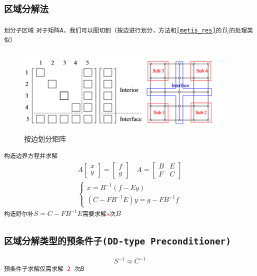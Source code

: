\documentclass[11pt, a4paper]{article}
\theoremstyle{plain}
\theoremstyle{plain}
\theoremstyle{plain}
\theoremstyle{definition}
\theoremstyle{remark}
\theoremstyle{definition}
\newcommand{\T}[1]{\texttt{#1}}
\newcommand{\red}[1]{\textcolor{red}{#1}}
\begin{document}
\subsection{\T{区域分解法}}
\T{划分子区域}
\T{对于矩阵A，我们可以图切割（按边进行划分，方法和\ref{metis_res}的$B_i$的处理类似）}
\begin{figure}[H]
	\label{SLR-1}
	\caption{按边划分矩阵\cite{SLR}}
	\centering
	\includegraphics[width=300pt,height=120pt]{SLR.png}
\end{figure}
\T{构造边界方程并求解}
\begin{gather}
		A \begin{bmatrix}
			x \\ y
		\end{bmatrix} = \begin{bmatrix}
			f \\ g 
		\end{bmatrix} \quad A = \begin{bmatrix}
			B & E \\ F & C
		\end{bmatrix} \\ 
		\begin{cases}
			x = B^{-1}(f - E y) \\
			(C - F B ^{-1} E) y = g - F B^{-1} f
		\end{cases}
\end{gather}
\T{构造舒尔补$S=C−FB^{−1}E$需要求解\red{$s$}次$B$
}
\subsection{\T{区域分解类型的预条件子(DD-type Preconditioner)}}
\begin{equation}
	S^{-1} \approx C^{-1}
\end{equation}
\T{预条件子求解仅需求解 \red{2} 次𝐵}
\end{document}
